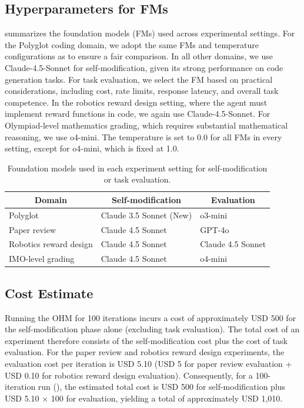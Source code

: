 \documentclass[]{fairmeta}
\begin{document}
\subsection{Hyperparameters for FMs}
\label{app:fm-hyperparam}

 summarizes the foundation models (FMs) used across experimental settings. For the Polyglot coding domain, we adopt the same FMs and temperature configurations as \citet{zhang2025darwin} to ensure a fair comparison. In all other domains, we use Claude-4.5-Sonnet for self-modification, given its strong performance on code generation tasks. For task evaluation, we select the FM based on practical considerations, including cost, rate limits, response latency, and overall task competence. In the robotics reward design setting, where the agent must implement reward functions in code, we again use Claude-4.5-Sonnet. For Olympiad-level mathematics grading, which requires substantial mathematical reasoning, we use o4-mini. The temperature is set to 0.0 for all FMs in every setting, except for o4-mini, which is fixed at 1.0.

\begin{table}[H]
\centering
\caption{Foundation models used in each experiment setting for self-modification or task evaluation.}
\label{tab:fm-hyperparam}
\begin{tabular}{@{}lll@{}}
\toprule
\multicolumn{1}{c}{\textbf{Domain}} & \multicolumn{1}{c}{\textbf{Self-modification}} & \multicolumn{1}{c}{\textbf{Evaluation}} \\ \midrule
Polyglot & Claude 3.5 Sonnet (New) & o3-mini \\
Paper review & Claude 4.5 Sonnet & GPT-4o \\
Robotics reward design & Claude 4.5 Sonnet & Claude 4.5 Sonnet \\
IMO-level grading & Claude 4.5 Sonnet & o4-mini \\ \bottomrule
\end{tabular}
\end{table}

\subsection{Cost Estimate}
\label{app:cost-estimate}

Running the OHM for 100 iterations incurs a cost of approximately USD 500 for the self-modification phase alone (excluding task evaluation). The total cost of an experiment therefore consists of the self-modification cost plus the cost of task evaluation. For the paper review and robotics reward design experiments, the evaluation cost per iteration is USD 5.10 (USD 5 for paper review evaluation + USD 0.10 for robotics reward design evaluation). Consequently, for a 100-iteration run (), the estimated total cost is USD 500 for self-modification plus USD 5.10 × 100 for evaluation, yielding a total of approximately USD 1,010.
\end{document}
